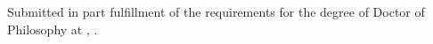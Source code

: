 \begin{titlepage}

  \center%
  \textsc{\LARGE \thesisUniversity}\\[1.0cm]
  \textsc{\Large \thesisDepartment}
  \vfill
  {\huge \bf \thesisTitle}\\[2.5cm]
  {\Large \thesisAuthor}
  \vfill

  \large
  Submitted in part fulfillment of the requirements for the degree of Doctor of
  Philosophy at \thesisUniversity, \thesisSubmitDate.

\end{titlepage}
